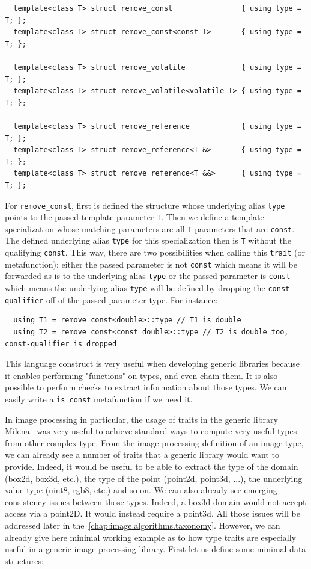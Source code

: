 \begin{verbatim}
  template<class T> struct remove_const                { using type = T; };
  template<class T> struct remove_const<const T>       { using type = T; };
  
  template<class T> struct remove_volatile             { using type = T; };
  template<class T> struct remove_volatile<volatile T> { using type = T; };

  template<class T> struct remove_reference            { using type = T; };
  template<class T> struct remove_reference<T &>       { using type = T; };
  template<class T> struct remove_reference<T &&>      { using type = T; };
\end{verbatim}

For \texttt{remove\_const}, first is defined the structure whose underlying alias \texttt{type} points to the passed
template parameter \texttt{T}. Then we define a template specialization whose matching parameters are all \texttt{T}
parameters that are \texttt{const}. The defined underlying alias \texttt{type} for this specialization then is
\texttt{T} without the qualifying \texttt{const}. This way, there are two possibilities when calling this \texttt{trait}
(or metafunction): either the passed parameter is not \texttt{const} which means it will be forwarded as-is to the
underlying alias \texttt{type} or the passed parameter is \texttt{const} which means the underlying alias \texttt{type}
will be defined by dropping the \texttt{const-qualifier} off of the passed parameter type. For instance:

\begin{verbatim}
  using T1 = remove_const<double>::type // T1 is double
  using T2 = remove_const<const double>::type // T2 is double too, const-qualifier is dropped
\end{verbatim}

This language construct is very useful when developing generic libraries because it enables performing "functions" on
types, and even chain them. It is also possible to perform checks to extract information about those types. We can
easily write a \texttt{is\_const} metafunction if we need it.

In image processing in particular, the usage of traits in the generic library
Milena~\parencite{levillain.2009.ismm,levillain.2010.icip} was very useful to achieve standard ways to compute very
useful types from other complex type. From the image processing definition of an image type, we can already see a number
of traits that a generic library would want to provide. Indeed, it would be useful to be able to extract the type of the
domain (box2d, box3d, etc.), the type of the point (point2d, point3d, ...), the underlying value type (uint8, rgb8,
etc.) and so on. We can also already see emerging consistency issues between those types. Indeed, a box3d domain would
not accept access via a point2D. It would instead require a point3d. All those issues will be addressed later in
the~\cref{chap:image.algorithms.taxonomy}. However, we can already give here minimal working example as to how type
traits are especially useful in a generic image processing library. First let us define some minimal data structures:

